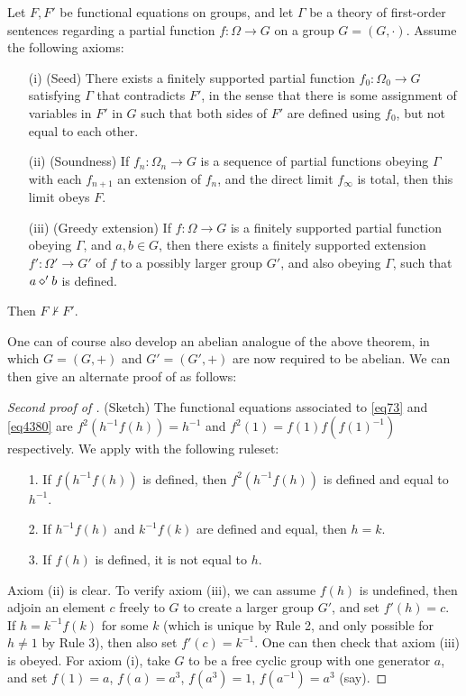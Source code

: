 \begin{theorem}\label{nc-greedy-abstract} Let $F,F'$ be functional equations on groups, and let $\Gamma$ be a theory of first-order sentences regarding a partial function $f \colon \Omega \to G$ on a group $G = (G,\cdot)$.  Assume the following axioms:
  \begin{itemize}
    \item[(i)] (Seed) There exists a finitely supported partial function $f_0 \colon \Omega_0 \to G$ satisfying $\Gamma$ that contradicts $F'$, in the sense that there is some assignment of variables in $F'$ in $G$ such that both sides of $F'$ are defined using $f_0$, but not equal to each other.
    \item[(ii)]  (Soundness)  If $f_n \colon \Omega_n \to G$ is a sequence of partial functions obeying $\Gamma$ with each $f_{n+1}$ an extension of $f_n$, and the direct limit $f_\infty$ is total, then this limit obeys $F$.
    \item[(iii)] (Greedy extension)  If $f \colon \Omega \to G$ is a finitely supported partial function obeying $\Gamma$, and $a,b \in G$, then there exists a finitely supported extension $f' \colon \Omega' \to G'$ of $f$ to a possibly larger group $G'$, and also obeying $\Gamma$, such that $a \diamond' b$ is defined.
  \end{itemize}
  Then $F \not \vdash F'$.
\end{theorem}

One can of course also develop an abelian analogue of the above theorem, in which $G = (G,+)$ and $G' = (G',+)$ are now required to be abelian.  We can then give an alternate proof of  as follows:

\begin{proof}[Second proof of ] (Sketch)  The functional equations associated to \eqref{eq73} and \eqref{eq4380} are
$f^2(h^{-1} f(h)) =h^{-1}$ and $f^2(1) = f(1) f(f(1)^{-1})$ respectively.  We apply  with the following ruleset:
\begin{itemize}
  \item[1.]  If $f(h^{-1} f(h))$ is defined, then $f^2(h^{-1} f(h))$ is defined and equal to $h^{-1}$.
  \item[2.]  If $h^{-1} f(h)$ and $k^{-1} f(k)$ are defined and equal, then $h=k$.
  \item[3.]  If $f(h)$ is defined, it is not equal to $h$.
\end{itemize}
Axiom (ii) is clear.  To verify axiom (iii), we can assume $f(h)$ is undefined, then adjoin an element $c$ freely to $G$ to create a larger group $G'$, and set $f'(h) = c$.  If $h = k^{-1} f(k)$ for some $k$ (which is unique by Rule 2, and only possible for $h \neq 1$ by Rule 3), then also set $f'(c) = k^{-1}$.  One can then check that axiom (iii) is obeyed.  For axiom (i), take $G$ to be a free cyclic group with one generator $a$, and set $f(1) = a$, $f(a) = a^3$, $f(a^3) = 1$, $f(a^{-1}) = a^3$ (say).
\end{proof}

